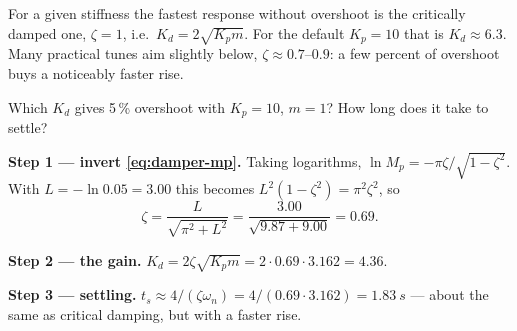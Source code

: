 \begin{keyidea}
For a given stiffness the fastest response without overshoot is the critically damped one, $\zeta = 1$, i.e.\ $K_d = 2\sqrt{K_p m}$. For the default $K_p = 10$ that is $K_d \approx 6.3$. Many practical tunes aim slightly below, $\zeta \approx 0.7$–$0.9$: a few percent of overshoot buys a noticeably faster rise.
\end{keyidea}

\begin{example}
\label{ex:damper-design}
Which $K_d$ gives 5\,\% overshoot with $K_p = 10$, $m = 1$? How long does it take to settle?

\textbf{Step 1 — invert \cref{eq:damper-mp}.} Taking logarithms, $\ln M_p = -\pi\zeta/\sqrt{1-\zeta^2}$. With $L = -\ln 0.05 = 3.00$ this becomes $L^2(1 - \zeta^2) = \pi^2\zeta^2$, so
\begin{equation*}
  \zeta = \frac{L}{\sqrt{\pi^2 + L^2}} = \frac{3.00}{\sqrt{9.87 + 9.00}} = 0.69 .
\end{equation*}

\textbf{Step 2 — the gain.} $K_d = 2\zeta\sqrt{K_pm} = 2\cdot0.69\cdot3.162 = 4.36$.

\textbf{Step 3 — settling.} $t_s \approx 4/(\zeta\omega_n) = 4/(0.69\cdot3.162) = \SI{1.83}{s}$ — about the same as critical damping, but with a faster rise.
\end{example}

